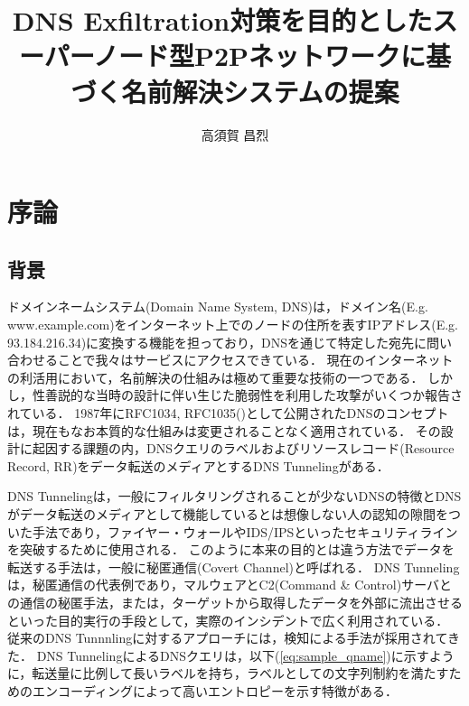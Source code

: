 \documentclass[12pt]{jarticle} %
\title{DNS Exfiltration対策を目的としたスーパーノード型P2Pネットワークに基づく名前解決システムの提案}
\author{高須賀 昌烈}
\begin{document}
\titlepage
\cmemberspage
\firstabstract
\secondabstract



\toc
\newpage
\listoffigures
\listoftables



\newpage
{}
\section{序論}
\subsection{背景}
ドメインネームシステム(Domain Name System, DNS)は，ドメイン名(E.g. www.example.com)をインターネット上でのノードの住所を表すIPアドレス(E.g. 93.184.216.34)に変換する機能を担っており，DNSを通じて特定した宛先に問い合わせることで我々はサービスにアクセスできている．
現在のインターネットの利活用において，名前解決の仕組みは極めて重要な技術の一つである．
しかし，性善説的な当時の設計に伴い生じた脆弱性を利用した攻撃がいくつか報告されている．
1987年にRFC1034, RFC1035(\cite{rfc1034, rfc1035})として公開されたDNSのコンセプトは，現在もなお本質的な仕組みは変更されることなく適用されている．
その設計に起因する課題の内，DNSクエリのラベルおよびリソースレコード(Resource Record, RR)をデータ転送のメディアとするDNS Tunnelingがある．

DNS Tunnelingは，一般にフィルタリングされることが少ないDNSの特徴とDNSがデータ転送のメディアとして機能しているとは想像しない人の認知の隙間をついた手法であり，ファイヤー・ウォールやIDS/IPSといったセキュリティラインを突破するために使用される．
このように本来の目的とは違う方法でデータを転送する手法は，一般に秘匿通信(Covert Channel)と呼ばれる\cite{covertchannel}．
DNS Tunnelingは，秘匿通信の代表例であり，マルウェアとC2(Command \& Control)サーバとの通信の秘匿手法，または，ターゲットから取得したデータを外部に流出させるといった目的実行の手段として，実際のインシデントで広く利用されている\cite{frameworkpos, bondupdater, bernhardpos, multigrainpos, pisloader, denis, dnsmessenger, udpos}．
従来のDNS Tunnnlingに対するアプローチには，検知による手法が採用されてきた．
DNS TunnelingによるDNSクエリは，以下(\ref{eq:sample_qname})に示すように，転送量に比例して長いラベルを持ち，ラベルとしての文字列制約を満たすためのエンコーディングによって高いエントロピーを示す特徴がある．
\end{document}
